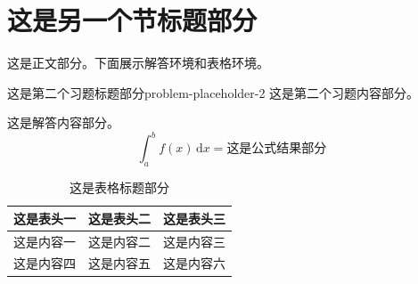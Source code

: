 \section{这是另一个节标题部分}

这是正文部分。下面展示解答环境和表格环境。

\begin{problem}{这是第二个习题标题部分}{problem-placeholder-2}
    这是第二个习题内容部分。
\end{problem}

\begin{solution}
    这是解答内容部分。
    \begin{equation}
        \int_a^b f(x)\,\mathrm{d}x = \text{这是公式结果部分}
    \end{equation}
\end{solution}

\begin{table}[H]
    \centering
    \caption{这是表格标题部分}
    \begin{tabular}{ccc}
        \toprule
        这是表头一 & 这是表头二 & 这是表头三 \\
        \midrule
        这是内容一 & 这是内容二 & 这是内容三 \\
        这是内容四 & 这是内容五 & 这是内容六 \\
        \bottomrule
    \end{tabular}
\end{table}

\endinput
